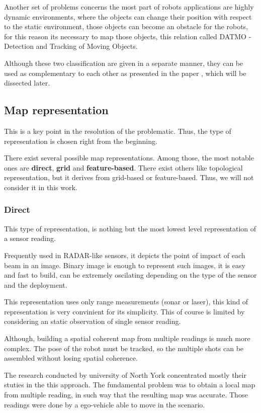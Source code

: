 Another set of problems concerns the most part of robots applications are highly dynamic environments, where the objects can change their position with respect to the static environment, those objects can become an obstacle for the robots, for this reason its necessary to map those objects, this relation called DATMO - Detection and Tracking of Moving Objects.

Although these two classification are given in a separate manner, they can be used as complementary to each other as presented in the paper \cite{Wang04a}, which will be dissected later.

\subsection{Map representation}

This is a key point in the resolution of the problematic. Thus, the type of representation is chosen right from the beginning.

There exist several possible map representations. Among those, the most notable ones are \textbf{direct}, \textbf{grid} and \textbf{feature-based}. There exist others like topological representation, but it derives from grid-based or feature-based. Thus, we will not consider it in this work.

\subsubsection{Direct}

This type of representation, is nothing but the most lowest level representation of a sensor reading. 

Frequently used in RADAR-like sensors, it depicts the point of impact of each beam in an image. Binary image is enough to represent such images, it is easy and fast to build, can be extremely oscilating depending on the type of the sensor and the deployment.

This representation uses only range measurements (sonar or laser), this kind of representation is very convinient for its simplicity. This of course is limited by considering an static observation of single sensor reading. 

Although, building a spatial coherent map from multiple readings is much more complex. The pose of the robot must be tracked, so the multiple shots can be assembled without losing  spatial coherence.

The research conducted by university of North York\cite{Lu:1997:GCR:591441.591464} concentrated mostly their stuties in the this approach. The fundamental problem was to obtain a local map from multiple reading, in such way that the resulting map was accurate. Those readings were done by a ego-vehicle able to move in the scenario.

